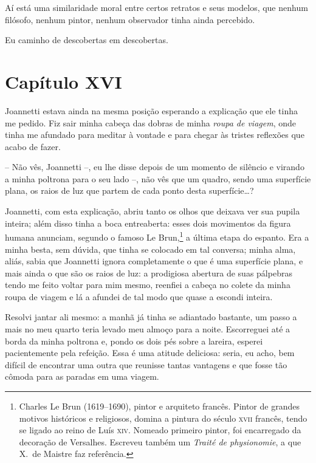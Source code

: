 Aí está uma similaridade moral entre certos retratos e seus modelos, que
nenhum filósofo, nenhum pintor, nenhum observador tinha ainda
percebido.

Eu caminho de descobertas em descobertas.

\section{Capítulo XVI}

 Joannetti estava ainda na mesma posição esperando a explicação que ele
tinha me pedido. Fiz sair minha cabeça das dobras de minha
\textit{roupa de viagem}, onde tinha me afundado para meditar à vontade
e para chegar às tristes reflexões que acabo de fazer.  

-- Não vês, Joannetti --, eu lhe disse depois de um momento de silêncio e
virando a minha poltrona para o seu lado --, não vês que um quadro, sendo
uma superfície plana, os raios de luz que partem de cada ponto desta
superfície\ldots?

Joannetti, com esta explicação, abriu tanto os olhos que deixava ver sua
pupila inteira; além disso tinha a boca entreaberta: esses dois
movimentos da figura humana anunciam, segundo o famoso Le
Brun,\footnote{ Charles Le Brun (1619--1690), pintor e arquiteto francês.
Pintor de grandes motivos históricos e religiosos, domina a pintura do
século \textsc{xvii} francês, tendo se ligado ao reino de Luís \textsc{xiv}. Nomeado
primeiro pintor, foi encarregado da decoração de Versalhes. Escreveu
também um \textit{Traité de physionomie}, a que X.~de Maistre faz
referência.} a última etapa do espanto. Era a minha besta, sem
dúvida, que tinha se colocado em tal conversa; minha alma, aliás, sabia
que Joannetti ignora completamente o que é uma superfície plana, e mais
ainda o que são os raios de luz: a prodigiosa abertura de suas
pálpebras tendo me feito voltar para mim mesmo, reenfiei a cabeça no
colete da minha roupa de viagem e lá a afundei de tal modo que quase a
escondi inteira.

 Resolvi jantar ali mesmo: a manhã já tinha se adiantado bastante, um
passo a mais no meu quarto teria levado meu almoço para a noite.
Escorreguei até a borda da minha poltrona e, pondo os dois pés sobre a
lareira, esperei pacientemente pela refeição. Essa é uma atitude
deliciosa: seria, eu acho, bem difícil de encontrar uma outra que
reunisse tantas vantagens e que fosse tão cômoda para as paradas em uma
viagem. 

